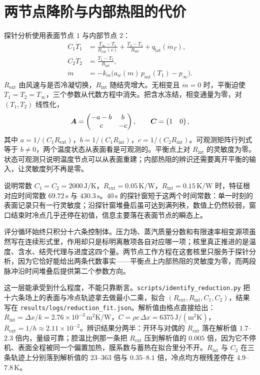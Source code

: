 \section{两节点降阶与内部热阻的代价}

探针分析使用表面节点 \(1\) 与内部节点 \(2\)：
\begin{align}
\label{eq:twonode}
C_1\dot T_1
&=\frac{T_\infty-T_1}{R_{\mathrm{ext}}(v)}+\frac{T_2-T_1}{R_{\mathrm{int}}}
+q_{\mathrm{lat}}(\dot m_\Gamma),\\
C_2\dot T_2
&=\frac{T_1-T_2}{R_{\mathrm{int}}},\\
\dot m
&=-k_m\big(a_w(m)\,p_{\mathrm{sat}}(T_1)-p_\infty\big).
\end{align}
\(R_{\mathrm{ext}}\) 由风速与是否冷凝切换，\(R_{\mathrm{int}}\) 随结壳增大。无相变且 \(\dot m=0\) 时，平衡迫使 \(T_1=T_2=T_\infty\)，三个参数从代数方程中消失。把含水冻结，相变通量为零，对 \((T_1,T_2)\) 线性化，
\[
\bm{A}=\begin{pmatrix}-a-b & b\\ c & -c\end{pmatrix},\qquad
\bm{C}=\begin{pmatrix}1 & 0\end{pmatrix},
\]
其中 \(a=1/(C_1 R_{\mathrm{ext}})\)，\(b=1/(C_1 R_{\mathrm{int}})\)，\(c=1/(C_2 R_{\mathrm{int}})\)。可观测矩阵行列式等于 \(b\neq 0\)，两个温度状态从表面看是可观测的。平衡点上对 \(R_{\mathrm{int}}\) 的灵敏度为零。状态可观测只说明温度节点可以从表面重建；内部热阻的辨识还需要离开平衡的输入，让灵敏度列不再是零。

说明常数 \(C_1=C_2=2000\,\mathrm{J/K}\)，\(R_{\mathrm{ext}}=0.05\,\mathrm{K/W}\)，\(R_{\mathrm{int}}=0.15\,\mathrm{K/W}\) 时，特征根对应时间常数 \(69.72\,\mathrm{s}\) 与 \(430.3\,\mathrm{s}\)。\(40\,\mathrm{s}\) 的探针窗短于这两个时间常数：单一时刻的表面记录只有一行灵敏度；沿探针窗堆叠后虽可达到满列秩，数值上仍然较弱，窗口结束时冷点几乎还停在初值，信息主要落在表面节点的瞬态上。

评分循环始终只积分十六条控制体。压力场、蒸汽质量分数和有限速率相变源项虽然写在连续形式里，作用却只是标明离散项各自对应哪一项；核里真正推进的是温度、含水、结壳代理与进度这四个量。两节点工作方程在这套核里只服务于探针分析，因为它恰好能给出两条代数事实——平衡点上内部热阻的灵敏度为零，而两段脉冲沿时间堆叠后提供第二个参数方向。

这一层能承受到什么程度，不能只靠断言。\texttt{scripts/identify\_reduction.py} 把十六条场上的表面与冷点轨迹拿去做最小二乘，拟合 \((R_{\mathrm{ext}},R_{\mathrm{int}},C_1,C_2)\)，结果写在 \texttt{results/logs/reduction\_fit.json}。解析值由格点直接给出：\(R_{\mathrm{int}}=\Delta x/k=2.76\times10^{-3}\,\mathrm{m^2K/W}\)，\(C=\rho c\,\Delta x=6375\,\mathrm{J/(m^2K)}\)，\(R_{\mathrm{ext}}=1/h\approx2.11\times10^{-2}\)。辨识结果分两半：开环与对偶的 \(R_{\mathrm{ext}}\) 落在解析值 \(1.7\)--\(2.3\) 倍内，量级可靠；腔温比例那一条把 \(R_{\mathrm{ext}}\) 压到解析值的 \(0.005\) 倍，因为它不停机、表面全程被同一个偏置加热，膜系数与蓄热在拟合里分不开。\(R_{\mathrm{int}}\) 与 \(C_2\) 在三条轨迹上分别落到解析值的 \(23\)--\(363\) 倍与 \(0.35\)--\(8.1\) 倍，冷点均方根残差停在 \(4.9\)--\(7.8\,\mathrm{K}\)。


